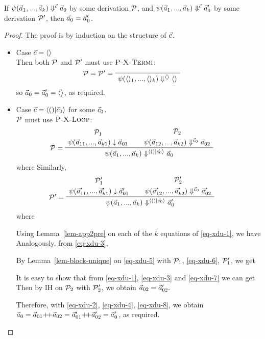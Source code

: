 \begin{lem} \label{lem-xducer-determ}
	If $\psi(\vec a_1,...,\vec a_{k}) \Downarrow^{\vec c} \vec a_0$ by some derivation $\mathcal{P}$,
	and $\psi(\vec a_1,...,\vec a_{k}) \Downarrow^{\vec c} \vec a'_0$ by some derivation $\mathcal{P}'$,
	then $\vec a_0 = \vec a'_0$.
\end{lem}

\begin{proof}
	The proof is by induction on the structure of $\vec c$. 
	\begin{itemize}
		\item Case $\vec c = \langle \rangle$ \\
		Then both $\mathcal{P}$ and $\mathcal{P}'$ must use $\textsc{P-X-Termi}$:
		$$\PT{ 
			 \LeLa{\MP = \MP' = }
			 \Axiom{\sevalf {\emptyv_1} {\emptyv_k} \emptyv \emptyv}
			}$$
		so $\vec a_0 = \vec a_0' = \langle \rangle$, as required.
		
		\item Case $\c = \< () | \c_0 \'>$ for some $\vec c_0$. \\		
		$\mathcal{P}$ must use $\textsc{P-X-Loop}$:
		$$\PT{
			\UCN{\MP_1}{\block{\a_{11}}{\a_{k1}}{\a_{01}}}
			\UCN{\MP_2}{\sevalf{\a_{12}}{\a_{k2}}{\c_0}{\a_{02}}}
			\LeLa{\MP = }
			\BC{\sevalf{\a_1}{\a_k}{\< () | \c_0 \rangle}{\a_0}}
		}$$
		where 
		Similarly,
		$$\PT{
			\UCN{\MP'_1}{\block{\a'_{11}}{\a'_{k1}}{\a'_{01}}}
			\UCN{\MP'_2}{\sevalf{\a'_{12}}{\a'_{k2}}{\c_0}{\a'_{02}}}
			\LeLa{\MP' = }
			\BC{\sevalf{\a_1}{\a_k}{\< () | \c_0 \rangle}{\a'_0}}
		}$$
		where
		
		Using Lemma~\ref{lem-app2pre} on each of the $k$ equations of \eqref{eq-xdu-1}, we have 
		Analogously, from  \eqref{eq-xdu-3},
		
		By Lemma~\ref{lem-block-unique} on \eqref{eq-xdu-5} with
		$\mathcal{P}_1$, \eqref{eq-xdu-6}, $\mathcal{P}_1'$, we get
		
		It is easy to show that from \eqref{eq-xdu-1}, \eqref{eq-xdu-3} and \eqref{eq-xdu-7} we can get
		Then by IH on $\mathcal{P}_2$ with $\mathcal{P}_2'$, we obtain $\vec a_{02} = \vec a'_{02}.$
		
		Therefore, with \eqref{eq-xdu-2}, \eqref{eq-xdu-4}, \eqref{eq-xdu-8}, 
		we obtain $\a_0 = \a_{01} {\++} \a_{02} = \a'_{01} {\++} \a'_{02} = \a'_0$, as required.
	\end{itemize}
	
	
\end{proof}


